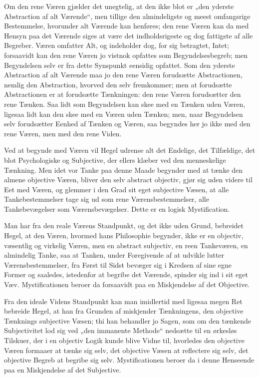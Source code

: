 \documentclass[11pt]{book}
\newcommand{\opage}[1]{\marginnote{\footnotesize\textit{[#1]}}}
\begin{document}
Om den rene Væren gjælder det unegtelig, at den ikke blot er „den
yderste Abstraction af alt Værende“, men tillige den almindeligste og
meest omfangsrige Bestemmelse, hvorunder alt Værende kan henføres; den
rene Væren kan da med Hensyn paa det Værende siges at være det
indholdsrigeste og dog fattigste af alle Begreber. Væren omfatter Alt,
og indeholder dog, for sig betragtet, Intet; forsaavidt
\opage{3} \setcounter{footnote}{0}%
kan den rene Væren jo vistnok opfattes som Begyndelsesbegreb; men
Begyndelsen selv er fra dette Synspunkt eensidig opfattet. Som den
yderste Abstraction af alt Værende maa jo den rene Væren forudsætte
Abstractionen, nemlig den Abstraction, hvorved den selv fremkommer; men
at forudsætte Abstractionen er at forudsætte Tænkningen: den rene Væren
forudsætter den rene Tænken. Saa lidt som Begyndelsen kan skee med en
Tænken uden Væren, ligesaa lidt kan den skee med en Væren uden Tænken;
men, naar Begyndelsen selv forudsætter Eenhed af Tænken og Væren, saa
begyndes her jo ikke med den rene Væren, men med den rene Viden.

Ved at begynde med Væren vil Hegel udrense alt det Endelige, det
Tilfældige, det blot Psychologiske og Subjective, der ellers klæber ved
den menneskelige Tænkning. Men idet vor Tanke paa denne Maade begynder
med at tænke den almene objective Væren, bliver den selv abstract
objectiv, gjør sig uden videre til Eet med Væren, og glemmer i den Grad
sit eget subjective Væsen, at alle Tankebestemmelser tage sig ud som
rene Værensbestemmelser, alle Tankebevægelser som Værensbevægelser.
Dette er en logisk Mystification.

Man har fra den reale Værens Standpunkt, og det ikke uden Grund,
bebreidet Hegel, at den Væren, hvormed hans Philosophie begynder, ikke
er en objectiv, væsentlig og virkelig Væren, men en abstract subjectiv,
en reen Tankeværen, en almindelig Tanke, saa at Tanken, under
Foregivende af at udvikle lutter Værensbestemmelser, fra Først til
Sidst bevæger sig i Kredsen af sine egne Former og saaledes, istedenfor
at begribe det Værende, spinder sig ind i sit eget Væv.
Mystificationen beroer da forsaavidt paa en Miskjendelse af det
Objective.

Fra den ideale Videns Standpunkt kan man imidlertid med ligesaa megen
Ret bebreide Hegel, at han fra Grunden af miskjender Tænkningens, den
objective Tænknings subjective Væsen; thi han behandler jo Sagen, som
om den tænkende
\opage{4} \setcounter{footnote}{0}%
Subjectivitet lod sig ved „den immanente Methode“ nedsætte til en
ørkesløs Tilskuer, der i en objectiv Logik kunde blive Vidne til,
hvorledes den objective Væren formaaer at tænke sig selv, det objective
Væsen at reflectere sig selv, det objective Begreb at begribe sig selv.
Mystificationen beroer da i denne Henseende paa en Miskjendelse af det
Subjective.
\end{document}

